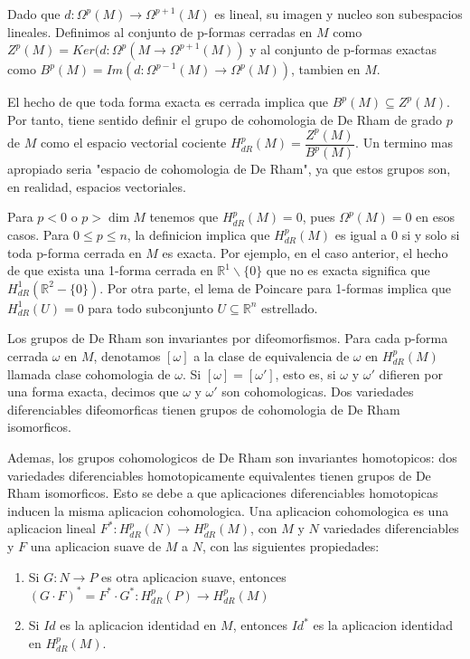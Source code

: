 \documentclass[12pt]{extarticle}
\newcommand{\R}{\mathbb{R}}
\newcommand{\<}{\langle}
\renewcommand{\>}{\rangle}
\theoremstyle{definition}
\begin{document}
Dado que $d:\Omega^p(M)\rightarrow \Omega^{p+1}(M)$ es lineal, su imagen y
nucleo son subespacios lineales. Definimos al conjunto de p-formas cerradas en $M$
como $Z^p(M)=Ker(d:\Omega^p(M \rightarrow \Omega^{p+1}(M))$ y al conjunto de p-formas
exactas como $B^p(M)=Im(d:\Omega^{p-1}(M) \rightarrow \Omega^p(M))$, tambien en
$M$.

El hecho de que toda forma exacta es cerrada implica que $B^p(M)\subseteq
Z^p(M)$. Por tanto, tiene sentido definir el grupo de cohomologia de De Rham de
grado $p$ de $M$ como el espacio vectorial cociente
$H_{dR}^p(M)=\dfrac{Z^p(M)}{B^p(M)}$. Un termino mas apropiado seria "espacio de
cohomologia de De Rham", ya que estos grupos son, en realidad, espacios
vectoriales.

Para $p<0$ o $p> \dim M$ tenemos que $H_{dR}^p(M)=0$, pues $\Omega^p(M)=0$ en esos
casos. Para $0\leq p \leq n$, la definicion implica que $H_{dR}^p(M)$ es igual a
$0$ si y solo si toda p-forma cerrada en $M$ es exacta. Por ejemplo, en el caso
anterior, el hecho de que exista una 1-forma cerrada en $\R^1\backslash\{0\}$
que no es exacta significa que $H_{dR}^1(\R^2-\{0\})$. Por otra parte, el lema
de Poincare para 1-formas implica que $H_{dR}^1(U)=0$ para todo subconjunto
$U\subseteq\R^n$ estrellado.

Los grupos de De Rham son invariantes por difeomorfismos. Para cada p-forma
cerrada $\omega$ en $M$, denotamos $[\omega]$ a la clase de equivalencia de
$\omega$ en $H_{dR}^p(M)$ llamada clase cohomologia de $\omega$. Si
$[\omega]=[\omega']$, esto es, si $\omega$ y $\omega'$ difieren por una forma
exacta, decimos que $\omega$ y $\omega'$ son cohomologicas. Dos variedades
diferenciables difeomorficas tienen grupos de cohomologia de De Rham
isomorficos.

Ademas, los grupos cohomologicos de De Rham son invariantes homotopicos: dos
variedades diferenciables homotopicamente equivalentes tienen grupos de De Rham
isomorficos. Esto se debe a que aplicaciones diferenciables homotopicas inducen
la misma aplicacion cohomologica. Una aplicacion cohomologica es una aplicacion lineal $F^*:H_{dR}^p(N)
\rightarrow H_{dR}^p(M)$, con $M$ y $N$ variedades diferenciables y $F$ una
aplicacion suave de $M$ a $N$, con las siguientes propiedades:
\begin{enumerate}
	\item Si $G : N \rightarrow P$ es otra aplicacion suave, entonces $(G \cdot
	F)^*=F^* \cdot G^* : H_{dR}^p(P) \rightarrow H_{dR}^p(M)$
	\item Si $Id$ es la aplicacion identidad en $M$, entonces $Id^*$ es la
	aplicacion identidad en $H_{dR}^p(M)$.
\end{enumerate}
\end{document}
